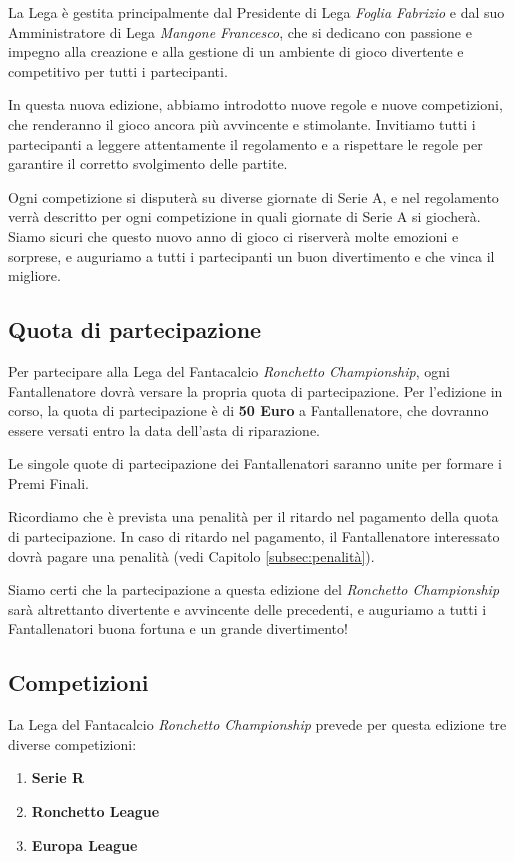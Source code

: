 \documentclass[12pt]{article}
\begin{document}
La Lega è gestita principalmente dal Presidente di Lega \textit{Foglia Fabrizio} e dal suo Amministratore di Lega \textit{Mangone Francesco}, che si dedicano con passione e impegno alla creazione e alla gestione di un ambiente di gioco divertente e competitivo per tutti i partecipanti.

In questa nuova edizione, abbiamo introdotto nuove regole e nuove competizioni, che renderanno il gioco ancora più avvincente e stimolante. Invitiamo tutti i partecipanti a leggere attentamente il regolamento e a rispettare le regole per garantire il corretto svolgimento delle partite.

Ogni competizione si disputerà su diverse giornate di Serie A, e nel regolamento verrà descritto per ogni competizione in quali giornate di Serie A si giocherà. Siamo sicuri che questo nuovo anno di gioco ci riserverà molte emozioni e sorprese, e auguriamo a tutti i partecipanti un buon divertimento e che vinca il migliore.


\subsection{Quota di partecipazione}
Per partecipare alla Lega del Fantacalcio \textit{Ronchetto Championship}, ogni Fantallenatore dovrà versare la propria quota di partecipazione. Per l'edizione in corso, la quota di partecipazione è di \textbf{50 Euro} a Fantallenatore, che dovranno essere versati entro la data dell'asta di riparazione.

Le singole quote di partecipazione dei Fantallenatori saranno unite per formare i Premi Finali.

Ricordiamo che è prevista una penalità per il ritardo nel pagamento della quota di partecipazione. In caso di ritardo nel pagamento, il Fantallenatore interessato dovrà pagare una penalità (vedi Capitolo \ref{subsec:penalità}).

Siamo certi che la partecipazione a questa edizione del \textit{Ronchetto Championship} sarà altrettanto divertente e avvincente delle precedenti, e auguriamo a tutti i Fantallenatori buona fortuna e un grande divertimento!

\subsection{Competizioni}

La Lega del Fantacalcio \textit{Ronchetto Championship} prevede per questa edizione tre diverse competizioni: 
\begin{enumerate}
    \item \textbf{Serie R}
    \item \textbf{Ronchetto League}
    \item \textbf{Europa League}
\end{enumerate}
\end{document}
